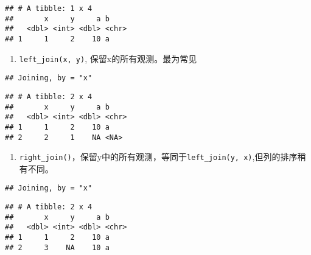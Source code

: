\documentclass[
]{article}
\newenvironment{Shaded}{\begin{snugshade}}{\end{snugshade}}
\newcommand{\KeywordTok}[1]{\textcolor[rgb]{0.13,0.29,0.53}{\textbf{#1}}}
\newcommand{\NormalTok}[1]{#1}
\newcommand{\OperatorTok}[1]{\textcolor[rgb]{0.81,0.36,0.00}{\textbf{#1}}}
\newcommand{\StringTok}[1]{\textcolor[rgb]{0.31,0.60,0.02}{#1}}
\providecommand{\tightlist}{%
  \setlength{\itemsep}{0pt}\setlength{\parskip}{0pt}}
\begin{document}
\begin{verbatim}
## # A tibble: 1 x 4
##       x     y     a b    
##   <dbl> <int> <dbl> <chr>
## 1     1     2    10 a
\end{verbatim}

\begin{enumerate}
\def\labelenumi{\arabic{enumi}.}
\setcounter{enumi}{1}
\tightlist
\item
  \texttt{left\_join(x,\ y)}, 保留x的所有观测。最为常见
\end{enumerate}

\begin{Shaded}
\end{Shaded}

\begin{verbatim}
## Joining, by = "x"
\end{verbatim}

\begin{verbatim}
## # A tibble: 2 x 4
##       x     y     a b    
##   <dbl> <int> <dbl> <chr>
## 1     1     2    10 a    
## 2     2     1    NA <NA>
\end{verbatim}

\begin{enumerate}
\def\labelenumi{\arabic{enumi}.}
\setcounter{enumi}{2}
\tightlist
\item
  \texttt{right\_join()}，保留y中的所有观测，等同于\texttt{left\_join(y,\ x)},但列的排序稍有不同。
\end{enumerate}

\begin{Shaded}
\end{Shaded}

\begin{verbatim}
## Joining, by = "x"
\end{verbatim}

\begin{verbatim}
## # A tibble: 2 x 4
##       x     y     a b    
##   <dbl> <int> <dbl> <chr>
## 1     1     2    10 a    
## 2     3    NA    10 a
\end{verbatim}

\begin{Shaded}
\end{Shaded}
\end{document}
